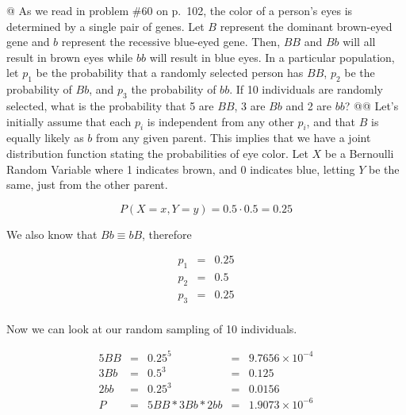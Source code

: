 \documentclass[11pt]{article}\usepackage[]{graphicx}\usepackage[]{xcolor}
\begin{document}
\begin{easylist}[enumerate]
    @ As we read in problem \#60 on p.\ 102, the color of a person's eyes is determined by a single pair of genes. Let
    $B$ represent the dominant brown-eyed gene and $b$ represent the recessive blue-eyed gene. Then, $BB$ and $Bb$ will
    all result in brown eyes while $bb$ will result in blue eyes. In a particular population, let $p_1$ be the
    probability that a randomly selected person has $BB$, $p_2$ be the probability of $Bb$, and $p_3$ the probability of
    $bb$. If 10 individuals are randomly selected, what is the probability that 5 are $BB$, 3 are $Bb$ and 2 are $bb$?
    @@ Let's initially assume that each $p_i$ is independent from any other $p_i$, and that $B$ is equally likely as $b$
    from any given parent. This implies that we have a joint distribution function stating the probabilities of eye
    color. Let $X$ be a Bernoulli Random Variable where 1 indicates brown, and 0 indicates blue, letting $Y$ be the
    same, just from the other parent.

    \[
        P(X=x, Y=y) = 0.5 \cdot 0.5 = 0.25
    \]

    We also know that $Bb \equiv bB$, therefore

    \[
        \begin{aligned}
            p_1 &=& 0.25\\
            p_2 &=& 0.5\\
            p_3 &=& 0.25\\
        \end{aligned}
    \]

    Now we can look at our random sampling of 10 individuals.




    \[
        \begin{aligned}
            5BB &=& 0.25^5 &=& \ensuremath{9.7656\times 10^{-4}}\\
            3Bb &=& 0.5^3 &=& 0.125\\
            2bb &=& 0.25^3 &=& 0.0156\\
            P &=& 5BB * 3Bb * 2bb &=& \ensuremath{1.9073\times 10^{-6}}
        \end{aligned}
    \]
\end{easylist}
\end{document}
